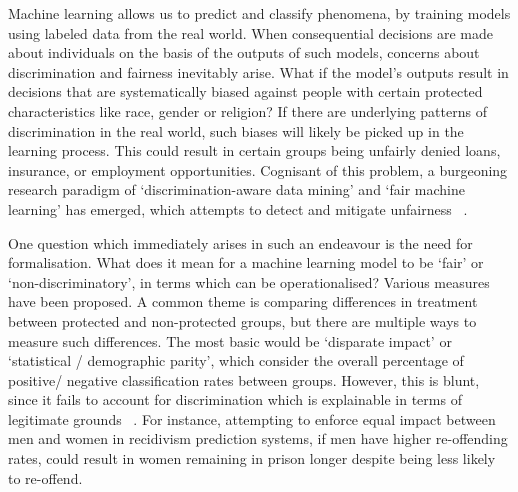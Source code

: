 \documentclass[pmlr,twocolumn,10pt]{jmlr}%
\begin{document}




Machine learning allows us to predict and classify phenomena, by training models using labeled data from the real world. When consequential decisions are made about individuals on the basis of the outputs of such models, concerns about discrimination and fairness inevitably arise. What if the model's outputs result in decisions that are systematically biased against people with certain protected characteristics like race, gender or religion? If there are underlying patterns of discrimination in the real world, such biases will likely be picked up in the learning process. This could result in certain groups being unfairly denied loans, insurance, or employment opportunities. Cognisant of this problem, a burgeoning research paradigm of `discrimination-aware data mining' and `fair machine learning' has emerged, which attempts to detect and mitigate unfairness ~\cite{hajian2013methodology,kamiran2013techniques,barocas2016big}.

One question which immediately arises in such an endeavour is the need for formalisation. What does it mean for a machine learning model to be `fair' or `non-discriminatory', in terms which can be operationalised? Various measures have been proposed. A common theme is comparing differences in treatment between protected and non-protected groups, but there are multiple ways to measure such differences. The most basic would be `disparate impact' or `statistical / demographic parity', which consider the overall percentage of positive/ negative classification rates between groups. However, this is blunt, since it fails to account for discrimination which is explainable in terms of legitimate grounds ~\cite{dwork2012fairness}. For instance, attempting to enforce equal impact between men and women in recidivism prediction systems, if men have higher re-offending rates, could result in women remaining in prison longer despite being less likely to re-offend.
\end{document}
